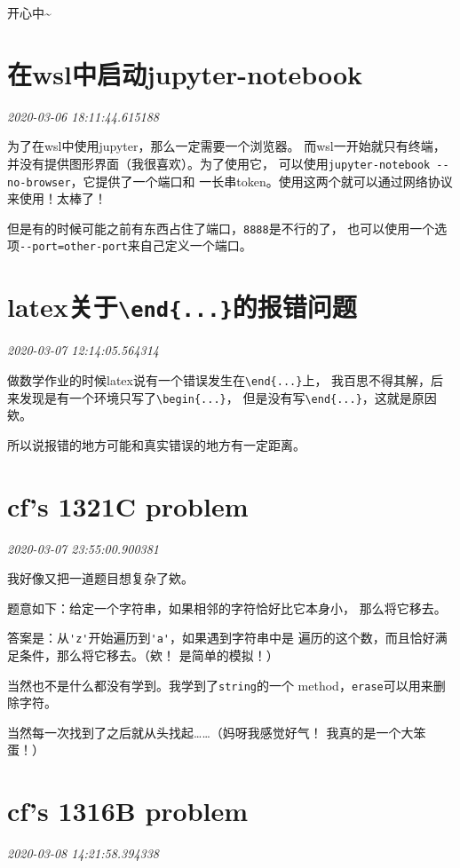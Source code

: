 \documentclass{peterlitsdoc}
\newcommand{\timetx}[1]
    {\par\noindent\emph{\pltgray\small #1}\vspace{2em}}
\newcommand{\vb}{\verb}
\begin{document}
开心中\~{}


\section{在wsl中启动jupyter-notebook}\timetx{2020-03-06 18:11:44.615188}

为了在wsl中使用jupyter，那么一定需要一个浏览器。
而wsl一开始就只有终端，并没有提供图形界面（我很喜欢）。为了使用它，
可以使用\vb|jupyter-notebook --no-browser|，它提供了一个端口和
一长串token。使用这两个就可以通过网络协议来使用！太棒了！

但是有的时候可能之前有东西占住了端口，\vb|8888|是不行的了，
也可以使用一个选项\vb|--port=other-port|来自己定义一个端口。


\section{latex关于\texttt{\textbackslash end\{...\}}的报错问题}
\timetx{2020-03-07 12:14:05.564314}

做数学作业的时候latex说有一个错误发生在\vb|\end{...}|上，
我百思不得其解，后来发现是有一个环境只写了\vb|\begin{...}|，
但是没有写\vb|\end{...}|，这就是原因欸。

所以说报错的地方可能和真实错误的地方有一定距离。


\section{cf's 1321C problem}
\timetx{2020-03-07 23:55:00.900381}

我好像又把一道题目想复杂了欸。

题意如下：给定一个字符串，如果相邻的字符恰好比它本身小，
那么将它移去。

答案是：从\vb|'z'|开始遍历到\vb|'a'|，如果遇到字符串中是
遍历的这个数，而且恰好满足条件，那么将它移去。（欸！
是简单的模拟！）

当然也不是什么都没有学到。我学到了\vb|string|的一个
method，\vb|erase|可以用来删除字符。

当然每一次找到了之后就从头找起\ldots\ldots（妈呀我感觉好气！
我真的是一个大笨蛋！）


\section{cf's 1316B problem}
\timetx{2020-03-08 14:21:58.394338}
\end{document}

